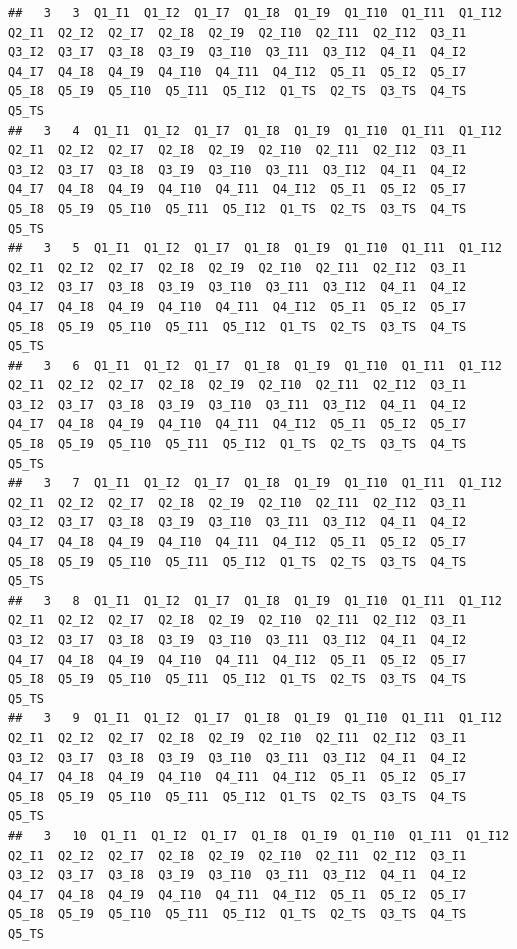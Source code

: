 \documentclass[]{book}
\begin{document}
\begin{verbatim}
##   3   3  Q1_I1  Q1_I2  Q1_I7  Q1_I8  Q1_I9  Q1_I10  Q1_I11  Q1_I12  Q2_I1  Q2_I2  Q2_I7  Q2_I8  Q2_I9  Q2_I10  Q2_I11  Q2_I12  Q3_I1  Q3_I2  Q3_I7  Q3_I8  Q3_I9  Q3_I10  Q3_I11  Q3_I12  Q4_I1  Q4_I2  Q4_I7  Q4_I8  Q4_I9  Q4_I10  Q4_I11  Q4_I12  Q5_I1  Q5_I2  Q5_I7  Q5_I8  Q5_I9  Q5_I10  Q5_I11  Q5_I12  Q1_TS  Q2_TS  Q3_TS  Q4_TS  Q5_TS
##   3   4  Q1_I1  Q1_I2  Q1_I7  Q1_I8  Q1_I9  Q1_I10  Q1_I11  Q1_I12  Q2_I1  Q2_I2  Q2_I7  Q2_I8  Q2_I9  Q2_I10  Q2_I11  Q2_I12  Q3_I1  Q3_I2  Q3_I7  Q3_I8  Q3_I9  Q3_I10  Q3_I11  Q3_I12  Q4_I1  Q4_I2  Q4_I7  Q4_I8  Q4_I9  Q4_I10  Q4_I11  Q4_I12  Q5_I1  Q5_I2  Q5_I7  Q5_I8  Q5_I9  Q5_I10  Q5_I11  Q5_I12  Q1_TS  Q2_TS  Q3_TS  Q4_TS  Q5_TS
##   3   5  Q1_I1  Q1_I2  Q1_I7  Q1_I8  Q1_I9  Q1_I10  Q1_I11  Q1_I12  Q2_I1  Q2_I2  Q2_I7  Q2_I8  Q2_I9  Q2_I10  Q2_I11  Q2_I12  Q3_I1  Q3_I2  Q3_I7  Q3_I8  Q3_I9  Q3_I10  Q3_I11  Q3_I12  Q4_I1  Q4_I2  Q4_I7  Q4_I8  Q4_I9  Q4_I10  Q4_I11  Q4_I12  Q5_I1  Q5_I2  Q5_I7  Q5_I8  Q5_I9  Q5_I10  Q5_I11  Q5_I12  Q1_TS  Q2_TS  Q3_TS  Q4_TS  Q5_TS
##   3   6  Q1_I1  Q1_I2  Q1_I7  Q1_I8  Q1_I9  Q1_I10  Q1_I11  Q1_I12  Q2_I1  Q2_I2  Q2_I7  Q2_I8  Q2_I9  Q2_I10  Q2_I11  Q2_I12  Q3_I1  Q3_I2  Q3_I7  Q3_I8  Q3_I9  Q3_I10  Q3_I11  Q3_I12  Q4_I1  Q4_I2  Q4_I7  Q4_I8  Q4_I9  Q4_I10  Q4_I11  Q4_I12  Q5_I1  Q5_I2  Q5_I7  Q5_I8  Q5_I9  Q5_I10  Q5_I11  Q5_I12  Q1_TS  Q2_TS  Q3_TS  Q4_TS  Q5_TS
##   3   7  Q1_I1  Q1_I2  Q1_I7  Q1_I8  Q1_I9  Q1_I10  Q1_I11  Q1_I12  Q2_I1  Q2_I2  Q2_I7  Q2_I8  Q2_I9  Q2_I10  Q2_I11  Q2_I12  Q3_I1  Q3_I2  Q3_I7  Q3_I8  Q3_I9  Q3_I10  Q3_I11  Q3_I12  Q4_I1  Q4_I2  Q4_I7  Q4_I8  Q4_I9  Q4_I10  Q4_I11  Q4_I12  Q5_I1  Q5_I2  Q5_I7  Q5_I8  Q5_I9  Q5_I10  Q5_I11  Q5_I12  Q1_TS  Q2_TS  Q3_TS  Q4_TS  Q5_TS
##   3   8  Q1_I1  Q1_I2  Q1_I7  Q1_I8  Q1_I9  Q1_I10  Q1_I11  Q1_I12  Q2_I1  Q2_I2  Q2_I7  Q2_I8  Q2_I9  Q2_I10  Q2_I11  Q2_I12  Q3_I1  Q3_I2  Q3_I7  Q3_I8  Q3_I9  Q3_I10  Q3_I11  Q3_I12  Q4_I1  Q4_I2  Q4_I7  Q4_I8  Q4_I9  Q4_I10  Q4_I11  Q4_I12  Q5_I1  Q5_I2  Q5_I7  Q5_I8  Q5_I9  Q5_I10  Q5_I11  Q5_I12  Q1_TS  Q2_TS  Q3_TS  Q4_TS  Q5_TS
##   3   9  Q1_I1  Q1_I2  Q1_I7  Q1_I8  Q1_I9  Q1_I10  Q1_I11  Q1_I12  Q2_I1  Q2_I2  Q2_I7  Q2_I8  Q2_I9  Q2_I10  Q2_I11  Q2_I12  Q3_I1  Q3_I2  Q3_I7  Q3_I8  Q3_I9  Q3_I10  Q3_I11  Q3_I12  Q4_I1  Q4_I2  Q4_I7  Q4_I8  Q4_I9  Q4_I10  Q4_I11  Q4_I12  Q5_I1  Q5_I2  Q5_I7  Q5_I8  Q5_I9  Q5_I10  Q5_I11  Q5_I12  Q1_TS  Q2_TS  Q3_TS  Q4_TS  Q5_TS
##   3   10  Q1_I1  Q1_I2  Q1_I7  Q1_I8  Q1_I9  Q1_I10  Q1_I11  Q1_I12  Q2_I1  Q2_I2  Q2_I7  Q2_I8  Q2_I9  Q2_I10  Q2_I11  Q2_I12  Q3_I1  Q3_I2  Q3_I7  Q3_I8  Q3_I9  Q3_I10  Q3_I11  Q3_I12  Q4_I1  Q4_I2  Q4_I7  Q4_I8  Q4_I9  Q4_I10  Q4_I11  Q4_I12  Q5_I1  Q5_I2  Q5_I7  Q5_I8  Q5_I9  Q5_I10  Q5_I11  Q5_I12  Q1_TS  Q2_TS  Q3_TS  Q4_TS  Q5_TS

\end{verbatim}
\end{document}
